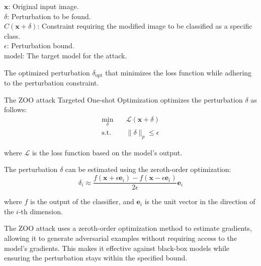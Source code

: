 
\textbf{$\mathbf{x}$}: Original input image. \\
\textbf{$\delta$}: Perturbation to be found. \\
\textbf{$C(\mathbf{x} + \delta)$}: Constraint requiring the modified image to be classified as a specific class. \\
\textbf{$\epsilon$}: Perturbation bound. \\
\textbf{$\text{model}$}: The target model for the attack.

The optimized perturbation $\delta_{\text{opt}}$ that minimizes the loss function while adhering to the perturbation constraint.

The ZOO attack Targeted One-shot Optimization optimizes the perturbation $\delta$ as follows:
\begin{equation*}
\begin{aligned}
\min_{\delta} & \quad \mathcal{L}(\mathbf{x} + \delta) \\
\text{s.t.} & \quad \|\delta\|_p \leq \epsilon
\end{aligned}
\end{equation*}

where $\mathcal{L}$ is the loss function based on the model's output.

The perturbation $\delta$ can be estimated using the zeroth-order optimization:
\begin{equation*}
\delta_i \approx \frac{f(\mathbf{x} + \epsilon \mathbf{e}_i) - f(\mathbf{x} - \epsilon \mathbf{e}_i)}{2 \epsilon} \mathbf{e}_i
\end{equation*}

where $f$ is the output of the classifier, and $\mathbf{e}_i$ is the unit vector in the direction of the $i$-th dimension.

The ZOO attack uses a zeroth-order optimization method to estimate gradients, allowing it to generate adversarial examples without requiring access to the model's gradients. This makes it effective against black-box models while ensuring the perturbation stays within the specified bound.